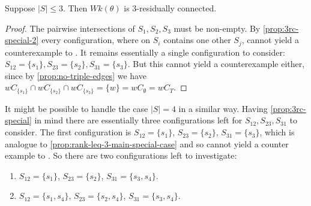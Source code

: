 \begin{coro}
	Suppose $|S| \leq 3$. Then $Wk(\theta)$ is 3-residually connected.

	\begin{proof}
		The pairwise intersections of $S_1,S_2,S_3$ must be non-empty. By \ref{prop:3rc-special-2} every configuration, where on $S_i$ contains one other $S_j$, cannot yield a counterexample to . It remains essentially a single configuration to consider: $S_{12} = \{s_1\}, S_{23} = \{s_2\}, S_{31} = \{s_3\}$. But this cannot yield a counterexample either, since by \ref{prop:no-triple-edges} we have $w C_{\{s_1\}} \cap w C_{\{s_2\}} \cap w C_{\{s_3\}} = \{ w \} = w C_\emptyset = w C_T$.
	\end{proof}
\end{coro}

\begin{rema}
	It might be possible to handle the case $|S| = 4$ in a similar way. Having \ref{prop:3rc-special} in mind there are essentially three configurations left for $S_{12},S_{23},S_{31}$ to consider. The first configuration is $S_{12} = \{s_1\}$, $S_{23} = \{s_2\}$, $S_{31} = \{s_3\}$, which is analogue to \ref{prop:rank-leq-3-main-special-case} and so cannot yield a counter example to . So there are two configurations left to investigate:
	\begin{enumerate}
		\item $S_{12} = \{s_1\}$, $S_{23} = \{s_2\}$, $S_{31} = \{s_3,s_4\}$.
		\item $S_{12} = \{s_1,s_4\}$, $S_{23} = \{s_2,s_4\}$, $S_{31} = \{s_3,s_4\}$.
	\end{enumerate}
\end{rema}

